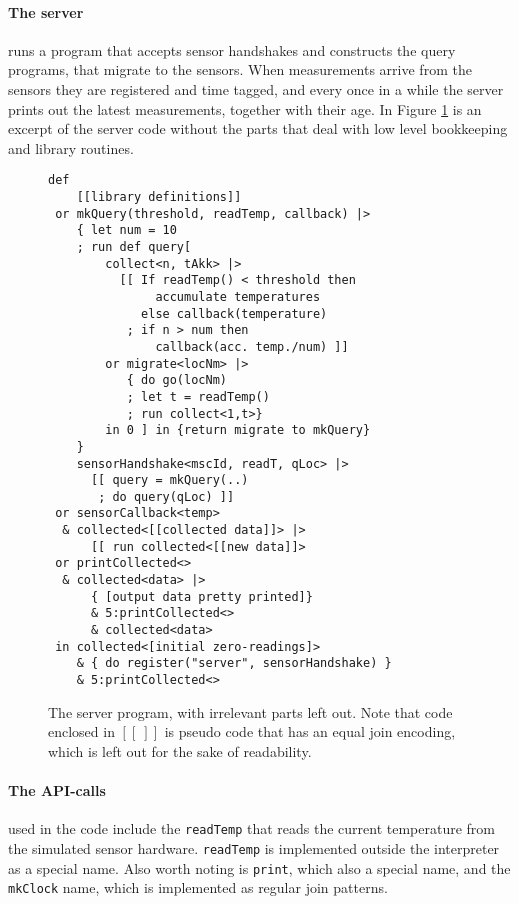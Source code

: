 
\paragraph{The server} runs a program that accepts sensor handshakes and
constructs the query programs, that migrate to the sensors.  When measurements
arrive from the sensors they are registered and time tagged, and every once in
a while the server prints out the latest measurements, together with their age.
In Figure \ref{fig:server-prog} is an excerpt of the server code without the
parts that deal with low level bookkeeping and library routines.
\begin{figure}[!h]
\begin{minipage}{0.97\textwidth}
\begin{verbatim}
def
    [[library definitions]]
 or mkQuery(threshold, readTemp, callback) |>
    { let num = 10
    ; run def query[
        collect<n, tAkk> |>
          [[ If readTemp() < threshold then
               accumulate temperatures
             else callback(temperature)
           ; if n > num then
               callback(acc. temp./num) ]]
        or migrate<locNm> |>
           { do go(locNm)
           ; let t = readTemp()
           ; run collect<1,t>}
        in 0 ] in {return migrate to mkQuery}
    }
    sensorHandshake<mscId, readT, qLoc> |>
      [[ query = mkQuery(..)
       ; do query(qLoc) ]]
 or sensorCallback<temp>
  & collected<[[collected data]]> |>
      [[ run collected<[[new data]]>
 or printCollected<>
  & collected<data> |>
      { [output data pretty printed]}
      & 5:printCollected<>
      & collected<data>
 in collected<[initial zero-readings]>
    & { do register("server", sensorHandshake) }
    & 5:printCollected<>
\end{verbatim}
\end{minipage}
\caption{The server program, with irrelevant parts left out. Note that code
enclosed in $\left[ \left[\ \right] \right]$ is pseudo code that has an equal
join encoding, which is left out for the sake of readability.}
\label{fig:server-prog}
\end{figure}

\paragraph{The API-calls} used in the code include the \texttt{readTemp} that
reads the current temperature from the simulated sensor hardware.
\texttt{readTemp} is implemented outside the interpreter as a special name.
Also worth noting is \texttt{print}, which also a special name, and the
\texttt{mkClock} name, which is implemented as regular join patterns.

